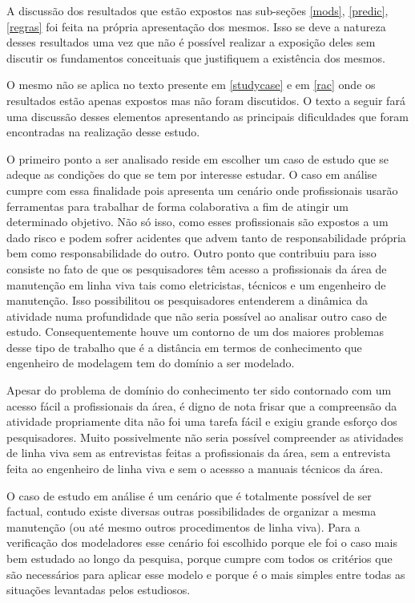A discussão dos resultados que estão expostos nas sub-seções \ref{mods}, \ref{predic}, \ref{regras} foi feita na própria apresentação dos mesmos. Isso se deve a natureza desses resultados 
uma vez que não é possível realizar a exposição deles sem discutir os fundamentos conceituais que justifiquem a existência dos mesmos. 

O mesmo não se aplica no texto presente em \ref{studycase} e em \ref{rac} onde os resultados estão apenas expostos mas não foram discutidos. O texto a seguir fará uma discussão desses elementos 
apresentando as principais dificuldades que foram encontradas na realização desse estudo. 

O primeiro ponto a ser analisado reside em escolher um caso de estudo que se adeque as condições do que se tem por interesse estudar. O caso em análise cumpre com essa finalidade pois 
apresenta um cenário onde profissionais usarão ferramentas para trabalhar de forma colaborativa a fim de atingir um determinado objetivo. Não só isso, como esses profissionais são 
expostos a um dado risco e podem sofrer acidentes que advem tanto de responsabilidade própria bem como responsabilidade do outro. Outro ponto que contribuiu para isso consiste no fato de que 
os pesquisadores têm acesso a profissionais da área de manutenção em linha viva tais como eletricistas, técnicos e um engenheiro de manutenção. Isso possibilitou os pesquisadores entenderem 
a dinâmica da atividade numa profundidade que não seria possível ao analisar outro caso de estudo. Consequentemente houve um contorno de um dos maiores problemas desse tipo de trabalho que é 
a distância em termos de conhecimento que engenheiro de modelagem tem do domínio a ser modelado. 

Apesar do problema de domínio do conhecimento ter sido contornado com um acesso fácil a profissionais da área, é digno de nota frisar que a compreensão da atividade propriamente dita não 
foi uma tarefa fácil e exigiu grande esforço dos pesquisadores. Muito possivelmente não seria possível compreender as atividades de linha viva sem as entrevistas feitas a profissionais da área, 
sem a entrevista feita ao engenheiro de linha viva e sem o acessso a manuais técnicos da área. 

O caso de estudo em análise é um cenário que é totalmente possível de ser factual, contudo existe diversas outras possibilidades de organizar a mesma manutenção (ou até mesmo outros 
procedimentos de linha viva). Para a verificação dos modeladores esse cenário foi escolhido porque ele foi o caso mais bem estudado ao longo da pesquisa, porque cumpre com todos os critérios  
que são necessários para aplicar esse modelo e porque é o mais simples entre todas as situações levantadas pelos estudiosos.

